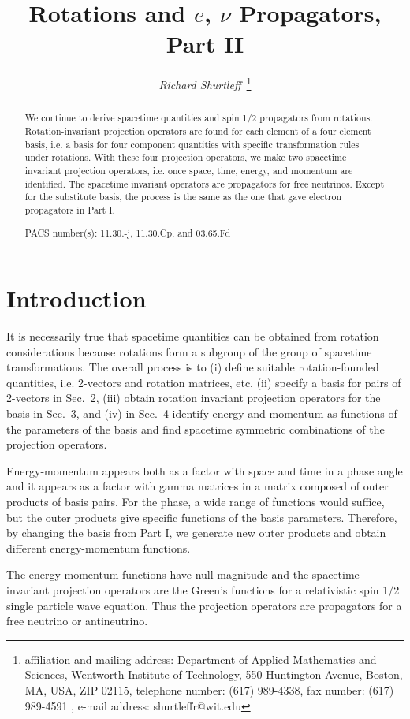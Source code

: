 \documentclass[a4paper,12pt]{article}
\title{ Rotations and $e$, $\nu$ Propagators, Part II}
\author{{\it Richard Shurtleff~}\thanks{affiliation and mailing 
address: Department of Applied Mathematics and Sciences, 
Wentworth Institute of Technology, 550 Huntington Avenue, 
Boston, MA, USA, ZIP 02115, telephone number: (617) 989-4338, fax 
number: (617) 989-4591 , e-mail address: shurtleffr@wit.edu}}
\begin{document}
 
          
\maketitle               
			\begin{abstract}  

We continue to derive spacetime quantities and spin 1/2 propagators from rotations. Rotation-invariant projection operators are found for each element of a four element basis, i.e. a basis for four component quantities with specific transformation rules under rotations. With these four projection operators, we make two spacetime invariant projection operators, i.e. once space, time, energy, and momentum are identified. The spacetime invariant operators are propagators for free neutrinos. Except for the substitute basis, the process is the same as the one that gave electron propagators in Part I. 

PACS number(s): 11.30.-j, 11.30.Cp, and 03.65.Fd 
 
			\end{abstract}
\pagebreak

\section{Introduction} \label{intro} %

	It is necessarily true that spacetime quantities can be obtained from rotation considerations because rotations form a subgroup of the group of spacetime transformations. The overall process \cite{partI} is to (i) define suitable rotation-founded quantities, i.e. 2-vectors and rotation matrices, etc, (ii) specify a basis for pairs of 2-vectors in Sec.~2, (iii) obtain rotation invariant projection operators for the basis in Sec.~3, and (iv) in Sec.~4 identify energy and momentum as functions of the parameters of the basis and find spacetime symmetric combinations of the projection operators.

	Energy-momentum appears both as a factor with space and time in a phase angle and it appears as a factor with gamma matrices in a matrix composed of outer products of basis pairs. For the phase, a wide range of functions would suffice, but the outer products give specific functions of the basis parameters. Therefore, by changing the basis from Part I, we generate new outer products and obtain different energy-momentum functions. 

	The energy-momentum functions have null magnitude and the spacetime invariant projection operators are the Green's functions for a relativistic spin 1/2 single particle wave equation. Thus the projection operators are propagators for a free neutrino or antineutrino.
\end{document}
